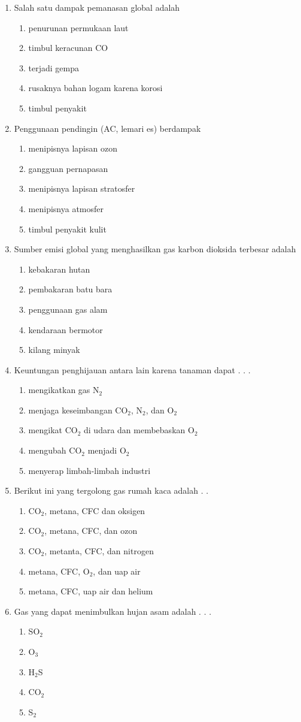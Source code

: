 \documentclass[10pt,a4paper]{extarticle}
\newcommand*\pilgan[1]{
\begin{enumerate}[label=\Alph*., itemsep=0pt,topsep=0pt,leftmargin=*,align=Center] #1 
\end{enumerate}}
\newcommand{\pilgani}[1]{                            \vspace{-0.3cm}\begin{multicols}{2}
 \begin{enumerate}[label=\Alph*., itemsep=0pt,topsep=0pt,leftmargin=*,align=Center]#1                     \end{enumerate}
 \phantom{ini cuma sapi, wedus, dan ayam}
 \end{multicols}}
\begin{document}
\begin{multicols*}{3}
\begin{enumerate}
\item Salah satu dampak pemanasan global adalah
\pilgan{
\item penurunan permukaan laut
\item timbul keracunan CO
\item terjadi gempa
\item rusaknya bahan logam karena korosi
\item timbul penyakit}

\item Penggunaan pendingin (AC, lemari es) berdampak
\pilgan{
\item menipisnya lapisan ozon
\item gangguan pernapasan
\item menipisnya lapisan stratosfer
\item menipisnya atmosfer
\item timbul penyakit kulit}

\item Sumber emisi global yang menghasilkan gas karbon dioksida terbesar adalah
\pilgan{
\item kebakaran hutan
\item pembakaran batu bara
\item penggunaan gas alam
\item kendaraan bermotor
\item kilang minyak}

\item Keuntungan penghijauan antara lain karena tanaman dapat . . .
\pilgan{
\item mengikatkan gas N$_2$
\item menjaga keseimbangan CO$_2$, N$_2$, dan O$_2$
\item mengikat CO$_2$ di udara dan membebaskan O$_2$
\item mengubah CO$_2$ menjadi O$_2$
\item menyerap limbah-limbah industri }


\item Berikut ini yang tergolong gas rumah kaca adalah . . 
\pilgan{
\item CO$_2$, metana, CFC dan oksigen
\item CO$_2$, metana, CFC, dan ozon
\item CO$_2$, metanta, CFC, dan nitrogen
\item metana, CFC, O$_2$, dan uap air
\item metana, CFC, uap air dan helium
}

\item Gas yang dapat menimbulkan hujan asam adalah . . .
\pilgani {
\item SO$_2$
\item O$_3$
\item H$_2$S
\item CO$_2$
\item S$_2$ }


\end{enumerate}
\end{multicols*}
\end{document}
